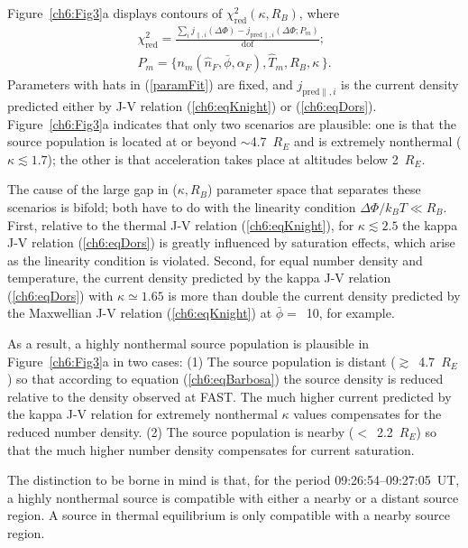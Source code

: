   Figure~\ref{ch6:Fig3}a displays contours of $\chi^2_{\textrm{red}} (
  \kappa, R_B )$, where
  \begin{subequations}
    \begin{align} \chi^2_{\mathrm{red}} = \frac{\sum_i j_{\parallel,i} (\Delta \Phi) - j_{\textrm{pred}\parallel,i}(\Delta \Phi; P_m)}{\mathrm{dof}}; \\
      P_m = \Big \{ n_m ( \hat{n}_F, \bar{\phi} , \alpha_F ),
      \hat{T}_m, R_B, \kappa \, \Big \}. \label{paramFit}
    \end{align}
  \end{subequations}
  Parameters with hats in (\ref{paramFit}) are fixed, and
  $j_{\textrm{pred}\parallel,i} $ is the current density predicted
  either by J-V relation (\ref{ch6:eqKnight}) or
  (\ref{ch6:eqDors}). Figure~\ref{ch6:Fig3}a indicates that only two
  scenarios are plausible: one is that the source population is
  located at or beyond $\sim$4.7~$R_E$ and is extremely nonthermal
  ($\kappa \lesssim 1.7$); the other is that acceleration takes place
  at altitudes below 2~$R_E$.

  The cause of the large gap in ($\kappa, R_B$) parameter space that
  separates these scenarios is bifold; both have to do with the
  linearity condition $\Delta \Phi / k_B T \ll R_B $. First, relative
  to the thermal J-V relation (\ref{ch6:eqKnight}), for $\kappa
  \lesssim 2.5$ the kappa J-V relation (\ref{ch6:eqDors}) is greatly
  influenced by saturation effects, which arise as the linearity
  condition is violated. Second, for equal number density and
  temperature, the current density predicted by the kappa J-V relation
  (\ref{ch6:eqDors}) with $\kappa \simeq 1.65$ is more than double the
  current density predicted by the Maxwellian J-V relation
  (\ref{ch6:eqKnight}) at $\bar{\phi} =$~10, for example.

  As a result, a highly nonthermal source population is plausible in
  Figure~\ref{ch6:Fig3}a in two cases: (1) The source population is
  distant ($\gtrsim$~4.7~$R_E$) so that according to equation
  (\ref{ch6:eqBarbosa}) the source density is reduced relative to the
  density observed at FAST. The much higher current predicted by the
  kappa J-V relation for extremely nonthermal $\kappa$ values
  compensates for the reduced number density. (2) The source
  population is nearby ($<$~2.2~$R_E$) so that the much higher number
  density compensates for current saturation.

  The distinction to be borne in mind is that, for the period
  09:26:54--09:27:05~UT, a highly nonthermal source is compatible with
  either a nearby or a distant source region. A source in thermal
  equilibrium is only compatible with a nearby source region.


